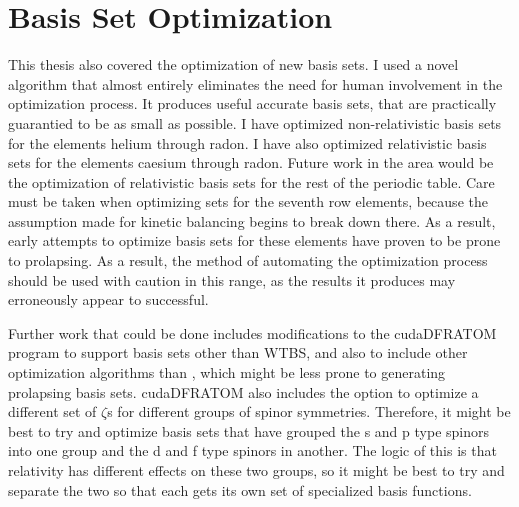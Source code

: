 \section{Basis Set Optimization}
This thesis also covered the optimization of new basis sets. I used a novel algorithm that almost entirely eliminates the need for human involvement in the optimization process. It produces useful accurate basis sets, that are practically guarantied to be as small as possible. I have optimized non-relativistic basis sets for the elements helium through radon. I have also optimized relativistic basis sets for the elements caesium through radon. Future work in the area would be the optimization of relativistic basis sets for the rest of the periodic table. Care must be taken when optimizing sets for the seventh row elements, because the assumption made for kinetic balancing begins to break down there. As a result, early attempts to optimize basis sets for these elements have proven to be prone to prolapsing. As a result, the method of automating the optimization process should be used with caution in this range, as the results it produces may erroneously appear to successful. 

Further work that could be done includes modifications to the cudaDFRATOM program to support basis sets other than WTBS, and also to include other optimization algorithms than , which might be less prone to generating prolapsing basis sets. cudaDFRATOM also includes the option to optimize a different set of $\zeta$s for different groups of spinor symmetries. Therefore, it might be best to try and optimize basis sets that have grouped the s and p type spinors into one group and the d and f type spinors in another. The logic of this is that relativity has different effects on these two groups, so it might be best to try and separate the two so that each gets its own set of specialized basis functions.